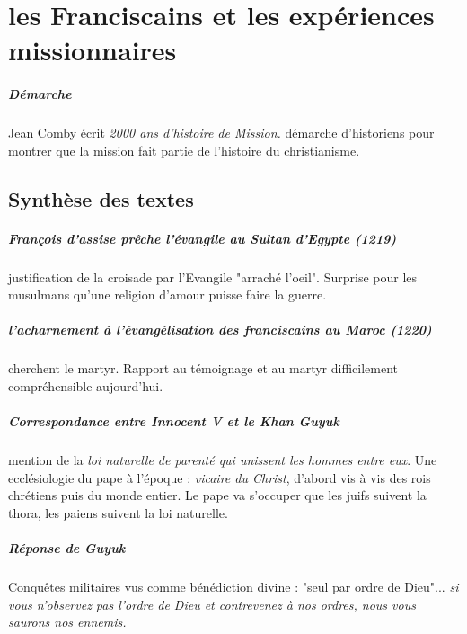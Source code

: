 \chapter{les Franciscains et les expériences missionnaires}


\paragraph{Démarche} Jean Comby écrit \textit{2000 ans d'histoire de Mission. }démarche d'historiens pour montrer que la mission fait partie de l'histoire du christianisme. 


\section{Synthèse des textes}
\paragraph{François d'assise prêche l'évangile au Sultan d'Egypte (1219)} justification de la croisade par l'Evangile "arraché l'oeil". Surprise pour les musulmans qu'une religion d'amour puisse faire la guerre.

\paragraph{l'acharnement à l'évangélisation des franciscains au Maroc (1220)} cherchent le martyr. Rapport au témoignage et au martyr difficilement compréhensible aujourd'hui.

\paragraph{Correspondance entre Innocent V et le Khan Guyuk}  mention de la \textit{loi naturelle de parenté qui unissent les hommes entre eux}.  Une ecclésiologie du pape à l'époque : \textit{vicaire du Christ}, d'abord vis à vis des rois chrétiens puis du monde entier. Le pape va s'occuper que les juifs suivent la thora, les paiens suivent la loi naturelle.


\paragraph{Réponse de Guyuk} Conquêtes militaires vus comme bénédiction divine : "seul par ordre de Dieu"... \textit{si vous n'observez pas l'ordre de Dieu et contrevenez à nos ordres, nous vous saurons nos ennemis.}

